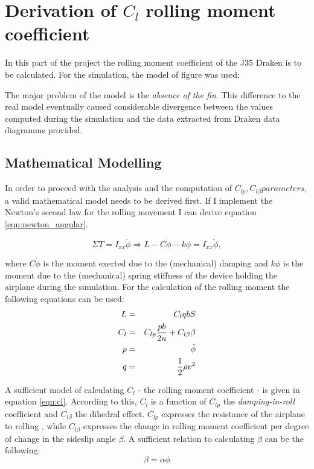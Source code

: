 \section{Derivation of $C_{l}$ rolling moment coefficient}
In this part of the project the rolling moment coefficient of the J35 Draken is to be calculated.
For the simulation, the model of figure %
was used:

The major problem of the model is the \textit{absence of the fin}. This difference to the 
real model eventually caused considerable divergence between the values computed during the 
simulation and the data extracted from Draken data diagramms provided.

\subsection{Mathematical Modelling}
In order to proceed with the analysis and the computation of $C_{lp}, C_{l\beta} parameters$, 
a valid mathematical model needs to be derived first. 
If I implement the Newton's second law for the rolling movement
I can derive equation \ref{eqn:newton_angular}.

\begin{equation}
    \Sigma T = I_{xx}\ddot{\phi} \Rightarrow 
    L - C\dot{\phi} - k\phi = I_{xx}\ddot{\phi},
    \label{eqn:newton_angular}
\end{equation}

\noindent where $C\dot{\phi}$ is the moment exerted due to the (mechanical) damping and $k\phi$ is
the moment due to the (mechanical) spring stiffness of the device holding the airplane during the simulation.
For the calculation of the rolling moment the following equations can be used:
\begin{eqnarray}
    L &=& C_l q b S \label{eqn:roll_moment} \label{eqn:L}\\
    C_l &=&  C_{lp}\frac{pb}{2u} + C_{l\beta}\beta \label{eqn:cl}\\
    p &=&\dot{\phi} \notag\\
    q &=&  \frac{1}{2}\rho v^2 \notag
\end{eqnarray}

A sufficient model of calculating $C_l$ - the rolling moment coefficient - is given in equation
\ref{eqn:cl}. According to this, $C_l$ is a function of $C_{lp}$ the \textit{damping-in-roll}
coefficient and $C_{l\beta}$ the dihedral effect.
$C_{lp}$ expresses the resistance of the airplane to rolling 
\cite{etkin_dynamics_1972}, while $C_{l\beta}$ expresses the change in rolling moment 
coefficient per degree of change in the sideslip angle $\beta$. A sufficient relation to 
calculating $\beta$ can be the following:
\begin{equation}
    \beta = \alpha \phi
    \label{eqn:beta}
\end{equation}

